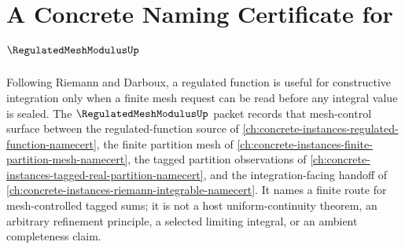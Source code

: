 \chapter{A Concrete Naming Certificate for $\RegulatedMeshModulusUp$}
\label{ch:concrete-instances-regulated-mesh-modulus-namecert}

Following Riemann and Darboux, a regulated function is useful for constructive integration only when a finite mesh request can be read before any integral value is sealed. The $\RegulatedMeshModulusUp$ packet records that mesh-control surface between the regulated-function source of \autoref{ch:concrete-instances-regulated-function-namecert}, the finite partition mesh of \autoref{ch:concrete-instances-finite-partition-mesh-namecert}, the tagged partition observations of \autoref{ch:concrete-instances-tagged-real-partition-namecert}, and the integration-facing handoff of \autoref{ch:concrete-instances-riemann-integrable-namecert}. It names a finite route for mesh-controlled tagged sums; it is not a host uniform-continuity theorem, an arbitrary refinement principle, a selected limiting integral, or an ambient completeness claim.

